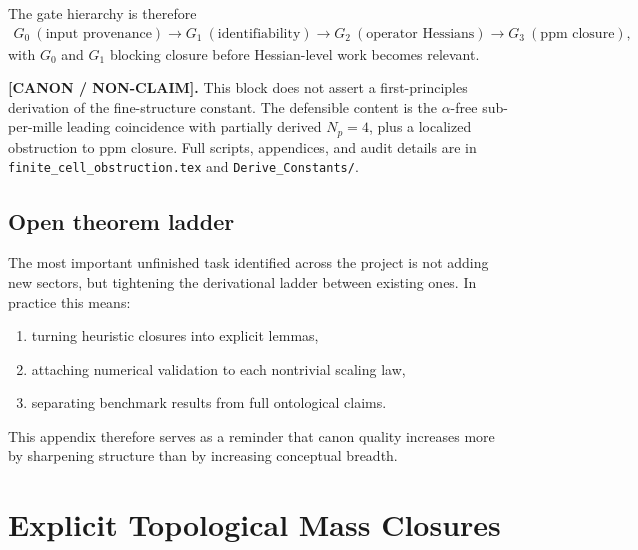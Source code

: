 \documentclass[11pt]{article}
\theoremstyle{definition}
\theoremstyle{plain}
\theoremstyle{remark}
\begin{document}
            The gate hierarchy is therefore
            \begin{align}
                G_0\ (\text{input provenance})
                \longrightarrow
                G_1\ (\text{identifiability})
                \longrightarrow
                G_2\ (\text{operator Hessians})
                \longrightarrow
                G_3\ (\text{ppm closure}),
                \label{eq:finite_cell_gate_hierarchy}
            \end{align}
            with $G_0$ and $G_1$ blocking closure before Hessian-level work becomes relevant.

            \textbf{[CANON / NON-CLAIM].}
            This block does not assert a first-principles derivation of the fine-structure
            constant. The defensible content is the $\alpha$-free sub-per-mille leading
            coincidence with partially derived $N_p=4$, plus a localized obstruction to
            ppm closure. Full scripts, appendices, and audit details are in
            \texttt{finite\_cell\_obstruction.tex} and \texttt{Derive\_Constants/}.
        \subsection{Open theorem ladder}
            The most important unfinished task identified across the project is not adding new sectors, but tightening the derivational ladder between existing ones. In practice this means:
            \begin{enumerate}
                \item turning heuristic closures into explicit lemmas,
                \item attaching numerical validation to each nontrivial scaling law,
                \item separating benchmark results from full ontological claims.
            \end{enumerate}
            This appendix therefore serves as a reminder that canon quality increases more by sharpening structure than by increasing conceptual breadth.

 
        \newpage
    
    
    \section{Explicit Topological Mass Closures}
    \label{sec:appendix_explicit_mass}
    
\end{document}
